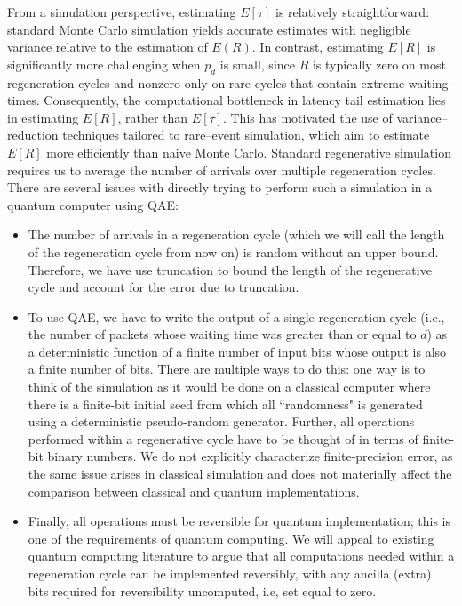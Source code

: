 \documentclass[11pt]{article}
\begin{document}
From a simulation perspective, estimating $E[\tau]$ is relatively
straightforward: standard Monte Carlo simulation yields accurate estimates
with negligible variance relative to the estimation of $E(R)$.
In contrast, estimating $E[R]$ is significantly more
challenging when $p_d$ is small, since $R$ is typically zero on most
regeneration cycles and nonzero only on rare cycles that contain extreme
waiting times.
Consequently, the computational bottleneck in latency tail estimation lies in
estimating $E[R]$, rather than $E[\tau]$.
This has motivated the use of
variance--reduction techniques tailored to rare--event simulation, which aim
to estimate $E[R]$ more efficiently than naive Monte Carlo.
Standard regenerative simulation requires us to average the number of arrivals over multiple regeneration cycles.
There are several issues with directly trying to perform such a simulation in a quantum computer using QAE:
\begin{itemize}
    \item The number of arrivals in a regeneration cycle (which we will call the length of the regeneration cycle from now on) is random without an upper bound.
Therefore, we have use truncation to bound the length of the regenerative cycle and account for the error due to truncation.
    \item To use QAE, we have to write the output of a single regeneration cycle (i.e., the number of packets whose waiting time was greater than or equal to $d$) as a deterministic function of a finite number of input bits whose output is also a finite number of bits.
There are multiple ways to do this: one way is to think of the simulation as it would be done on a classical computer where there is a finite-bit initial seed from which all ``randomness" is generated using a deterministic pseudo-random generator. Further, all operations performed within a regenerative cycle have to be thought of in terms of finite-bit binary numbers. We do not explicitly characterize finite-precision error, as the same issue arises in classical simulation and does not materially affect the comparison between classical and quantum implementations.
    \item Finally, all operations must be reversible for quantum implementation; this is one of the requirements of quantum computing. We will appeal to existing quantum computing literature to argue that all computations needed within a regeneration cycle can be implemented reversibly, with any ancilla (extra) bits required for reversibility uncomputed, i.e, set equal to zero.
\end{itemize}
\end{document}
